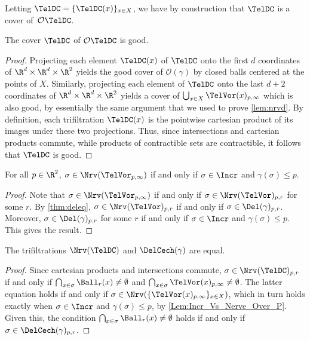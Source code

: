 %
Letting $\TelDC=\{\TelDC(x)\}_{x\in X}$, we have by construction that $\TelDC$ is a cover of~$\mathcal O\TelDC$.
%
\begin{lemma}\label{lem:nrvdc}
The cover $\TelDC$ of $\mathcal O\TelDC$ is good.  
\end{lemma}
%
\begin{proof}
Projecting each element $\TelDC(x)$ of $\TelDC$ onto the first $d$ coordinates of $\R^d\times \R^d\times \R^2$ yields the good cover of $\mathcal O(\gamma)$ by closed balls centered at the points of $X$.  Similarly, projecting each element of $\TelDC$ onto the last $d+2$ coordinates of $\R^d\times \R^d\times \R^2$ yields a cover of $\bigcup_{x\in X} 
\TelVor(x)_{p,\infty}$ which is also good, by essentially the same argument that we used to prove \cref{lem:nrvd}.  By definition, each trifiltration $\TelDC(x)$ is the pointwise cartesian product of its images under these two projections.  Thus, since intersections and cartesian products commute, while products of contractible sets are contractible, it follows that $\TelDC$ is good.
\end{proof}
%
\begin{lemma}\label{Lem:Incr_Vs_Nerve_Over_P}
For all $p\in \R^2$, $\sigma\in \Nrv(\TelVor_{p,\infty})$ if and only if $\sigma\in \Incr$ and $\gamma(\sigma)\leq p$.
\end{lemma}
%
\begin{proof}
Note that $\sigma\in \Nrv(\TelVor_{p,\infty})$ if and only if $\sigma \in  \Nrv(\TelVor)_{p,r}$ for some $r$.  By \cref{thm:deleq}, $\sigma \in  \Nrv(\TelVor)_{p,r}$ if and only if $\sigma\in \Del(\gamma)_{p,r}$.  Moreover, $\sigma \in\Del(\gamma)_{p,r}$ for some $r$ if and only if $\sigma\in \Incr$ and $\gamma(\sigma)\leq p$.    This gives the result.  
\end{proof}
%
%
%
\begin{proposition} \label{thm:delcecheq}
     The trifiltrations $\Nrv(\TelDC)$ and  $\DelCech(\gamma)$ are equal.
 \end{proposition}
%
%
%
\begin{proof}
 Since cartesian products and intersections commute, $\sigma \in \Nrv(\TelDC)_{p,r}$ if and only if $\bigcap_{x\in \sigma}\Ball_r(x) \neq\emptyset$ and $\bigcap_{x\in \sigma}\TelVor(x)_{p,\infty} \neq\emptyset$.  The latter equation holds if and only if $\sigma \in \Nrv(\{\TelVor(x)_{p,\infty}\}_{x\in X})$, which  in turn holds exactly when  $\sigma\in \Incr$ and $\gamma(\sigma)\leq p$, by \cref{Lem:Incr_Vs_Nerve_Over_P}.  Given this, the condition $\bigcap_{x\in \sigma}\Ball_r(x) \neq\emptyset$ holds if and only if $\sigma \in \DelCech(\gamma)_{p,r}$.
\end{proof}
